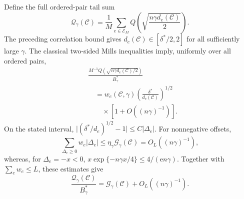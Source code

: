 \documentclass[12pt,draftclsnofoot,onecolumn]{IEEEtran}
\newcommand{\cC}{\mathcal{C}}
\newcommand{\cE}{\mathcal{E}}
\newcommand{\cG}{\mathcal{G}}
\newcommand{\cQ}{\mathcal{Q}}
\newcommand{\Qfun}{Q}
\theoremstyle{definition}
\begin{document}
\begin{IEEEproof}
Define the full ordered-pair tail sum
\begin{equation*}
  \cQ_\gamma(\cC)
  =\frac1M\sum_{e\in\cE_M}
  \Qfun\left(\sqrt{\frac{n\gamma d_e(\cC)}2}\right).
\end{equation*}
The preceding correlation bound gives
\(d_e(\cC)\in[\delta^{\ast}/2,2]\) for all sufficiently large
\(\gamma\).  The classical two-sided Mills inequalities
\cite{Gordon1941} imply, uniformly over all ordered pairs,
\begin{equation*}
\begin{aligned}
  &\frac{M^{-1}\Qfun(\sqrt{n\gamma d_e(\cC)/2})}
  {B_\gamma^{\ast}}\\
  &\quad=w_e(\cC,\gamma)
  \left(\frac{\delta^{\ast}}{d_e(\cC)}\right)^{1/2}\\
  &\qquad\times\left[1+O((n\gamma)^{-1})\right].
\end{aligned}
\end{equation*}
On the stated interval,
\(\lvert(\delta^{\ast}/d_e)^{1/2}-1\rvert
\le C|\Delta_e|\).  For nonnegative offsets,
\begin{equation*}
  \sum_{\Delta_e\ge0}w_e|\Delta_e|
  \le\eta_\gamma\cG_\gamma(\cC)
  =O_L((n\gamma)^{-1}),
\end{equation*}
whereas, for \(\Delta_e=-x<0\),
\(x\exp\{-n\gamma x/4\}\le4/(\mathrm e n\gamma)\).
Together with \(\sum_e w_e\le L\), these estimates give
\begin{equation}
  \frac{\cQ_\gamma(\cC)}{B_\gamma^{\ast}}
  =\cG_\gamma(\cC)+O_L((n\gamma)^{-1}).
  \label{eq:appendix-uniform-pair-sum}
\end{equation}


\end{IEEEproof}
\end{document}
